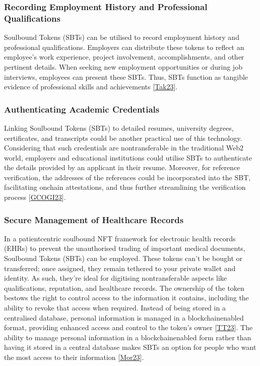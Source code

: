 \documentclass[letterpaper,10pt,english]{jupyterBook}
\begin{document}
\subsubsection{Recording Employment History and Professional Qualifications}
\label{\detokenize{SBT/SBT:recording-employment-history-and-professional-qualifications}}
\sphinxAtStartPar
Soulbound Tokens (SBTs) can be utilised to record employment history and professional qualifications. Employers can distribute these tokens to reflect an employee’s work experience, project involvement, accomplishments, and other pertinent details. When seeking new employment opportunities or during job interviews, employees can present these SBTs. Thus, SBTs function as tangible evidence of professional skills and achievements {[}\hyperlink{cite.SBT/SBT:id90}{Tak23}{]}.


\subsubsection{Authenticating Academic Credentials}
\label{\detokenize{SBT/SBT:authenticating-academic-credentials}}
\sphinxAtStartPar
Linking Soulbound Tokens (SBTs) to detailed resumes, university degrees, certificates, and transcripts could be another practical use of this technology. Considering that such credentials are non\sphinxhyphen{}transferable in the traditional Web2 world, employers and educational institutions could utilise SBTs to authenticate the details provided by an applicant in their resume. Moreover, for reference verification, the addresses of the references could be incorporated into the SBT, facilitating on\sphinxhyphen{}chain attestations, and thus further streamlining the verification process {[}\hyperlink{cite.SBT/SBT:id81}{GCOGI23}{]}.


\subsubsection{Secure Management of Healthcare Records}
\label{\detokenize{SBT/SBT:secure-management-of-healthcare-records}}
\sphinxAtStartPar
In a patient\sphinxhyphen{}centric soulbound NFT framework for electronic health records (EHRs) to prevent the unauthorised trading of important medical documents, Soulbound Tokens (SBTs) can be employed. These tokens can’t be bought or transferred; once assigned, they remain tethered to your private wallet and identity. As such, they’re ideal for digitising non\sphinxhyphen{}transferable aspects like qualifications, reputation, and healthcare records. The ownership of the token bestows the right to control access to the information it contains, including the ability to revoke that access when required. Instead of being stored in a centralised database, personal information is managed in a blockchain\sphinxhyphen{}enabled format, providing enhanced access and control to the token’s owner {[}\hyperlink{cite.SBT/SBT:id84}{TT23}{]}. The ability to manage personal information in a blockchain\sphinxhyphen{}enabled form rather than having it stored in a central database makes SBTs an option for people who want the most access to their information {[}\hyperlink{cite.SBT/SBT:id89}{Mor23}{]}.
\end{document}
